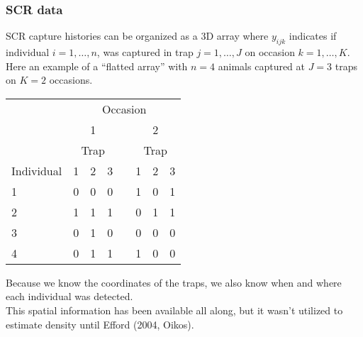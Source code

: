 \documentclass[color=usenames,dvipsnames]{beamer}\usepackage[]{graphicx}\usepackage[]{color}
\begin{document}
\begin{frame}
  \frametitle{SCR data}
  \small
  SCR capture histories can be organized as a 3D array where $y_{ijk}$
  indicates if individual $i=1,\dots,n$, was captured in trap
  $j=1,\dots,J$ on occasion $k=1,\dots,K$. \\
  \pause \vfill
  Here an example of a ``flatted array'' with $n=4$ animals captured
  at $J=3$ traps on $K=2$ occasions. \\
  \centering
  \vfill  
  \begin{tabular}{lccccccc}
    \hline
    & \multicolumn{7}{c}{Occasion} \\
    \cline{2-8}
    & \multicolumn{3}{c}{1} & & \multicolumn{3}{c}{2} \\
    \cline{2-4} \cline{6-8}
    & \multicolumn{3}{c}{Trap} & & \multicolumn{3}{c}{Trap} \\
    \cline{2-4} \cline{6-8}
    Individual & 1 & 2 & 3 & & 1 & 2 & 3 \\
    \hline
    1 & 0 & 0 & 0 & & 1 & 0 & 1 \\
    2 & 1 & 1 & 1 & & 0 & 1 & 1 \\
    3 & 0 & 1 & 0 & & 0 & 0 & 0 \\
    4 & 0 & 1 & 1 & & 1 & 0 & 0 \\
    \hline
  \end{tabular}
  \pause
  \vfill
  \flushleft
  Because we know the coordinates of the traps, we also know when and
  where each individual was detected. \\
  \pause
  \vfill
  This spatial information has been available all along, but it wasn't
  utilized to estimate density until Efford (2004, Oikos). \\
\end{frame}




\end{document}
